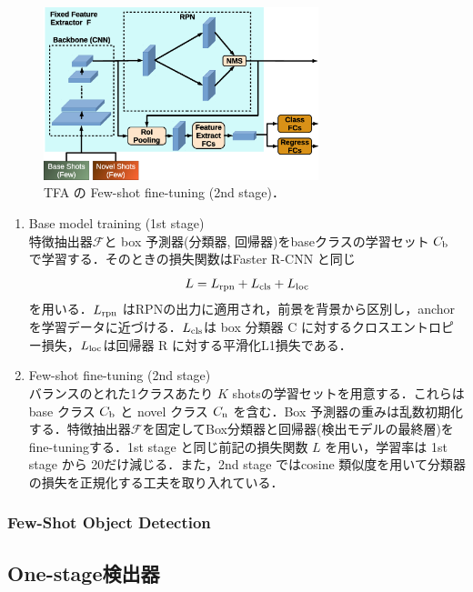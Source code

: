 \documentclass[originalpaper,fleqn]{jsaiart}     %
\begin{document}
\begin{figure}[tb]
    \begin{center}
        \includegraphics[width=8cm,clip]{fig/archi_TFA.eps}
    \end{center}
    \caption{ TFA の Few-shot fine-tuning (2nd stage)．}
    \label{fig:archi_TFA}
\end{figure}
\begin{enumerate}
    \item Base model training (1st stage) \\
    特徴抽出器$\mathcal{F}$と box 予測器(分類器, 回帰器)をbaseクラスの学習セット $C_{\rm b}$ で学習する．そのときの損失関数はFaster R-CNN \cite{RHGS15}と同じ $$L=L_{\rm rpn}+L_{\rm cls}+L_{\rm loc}$$を用いる．$L_{\rm rpn}$ はRPNの出力に適用され，前景を背景から区別し，anchorを学習データに近づける．$L_{\rm cls}$は box 分類器 C に対するクロスエントロピー損失，$L_{\rm loc}$は回帰器 R に対する平滑化L1損失である．
    \item Few-shot fine-tuning (2nd stage) \\
    バランスのとれた1クラスあたり $K$ shotsの学習セットを用意する．これらは base クラス $C_{\rm b}$ と novel クラス $C_{\rm n}$ を含む．Box 予測器の重みは乱数初期化する．特徴抽出器$\mathcal{F}$を固定してBox分類器と回帰器(検出モデルの最終層)をfine-tuningする．1st stage と同じ前記の損失関数 $L$ を用い，学習率は 1st stage から 20だけ減じる．また，2nd stage ではcosine 類似度を用いて分類器の損失を正規化する工夫を取り入れている．
\end{enumerate}

\subsubsection{Few-Shot Object Detection}

\subsection{One-stage検出器}
\end{document}
